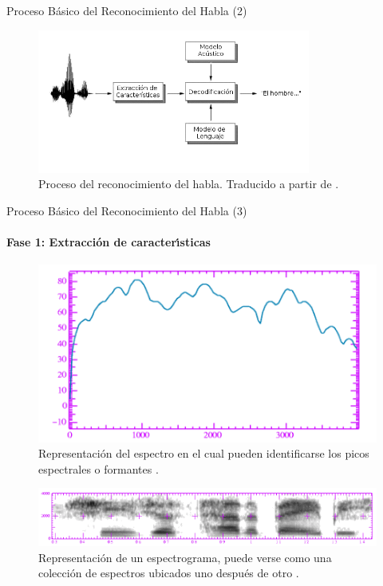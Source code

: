 \begin{frame}{Proceso B\'asico del Reconocimiento del Habla (2)}

\begin{figure}[H] 
\centering
\includegraphics[width=0.8\textwidth]{./graphics/proceso.png}
\caption{Proceso del reconocimiento del habla. Traducido a partir de \protect\cite{VerenichASR}.}
\label{figure:proceso}
\end{figure}
\end{frame}
\begin{frame}{Proceso B\'asico del Reconocimiento del Habla (3)}
\framesubtitle{Fase 1: Extracci\'on de caracter{\'\i}sticas}
\begin{figure}[H]
\centering
\includegraphics[width=0.4\linewidth]{./graphics/formants.png}
\caption{Representaci\'on del espectro en el cual pueden identificarse los picos espectrales o formantes 
\cite{Jurafsky}.}
\label{figure:formants}
\end{figure}


\begin{figure}[H]
\centering
\includegraphics[width=0.7\linewidth]{./graphics/spectrogram.png}
\caption{Representaci\'on de un espectrograma, puede verse como una colecci\'on de espectros  ubicados uno despu\'es de otro \cite{Jurafsky}.}
\label{figure:spectrogram}
\end{figure}

\end{frame}

